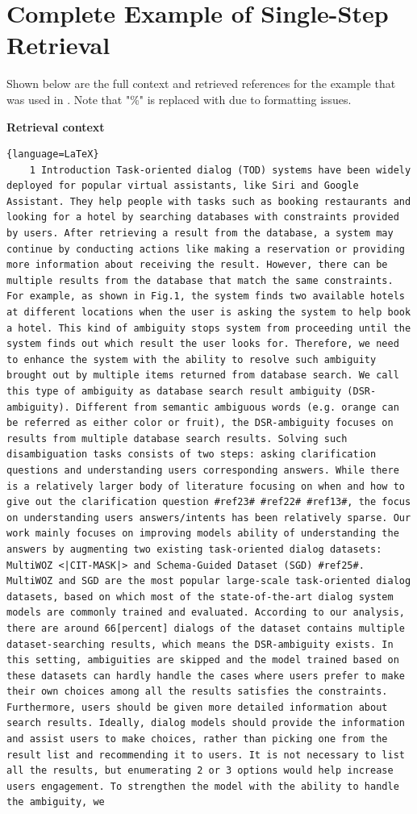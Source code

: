 \section{Complete Example of Single-Step Retrieval}\label{retrieval-example}
Shown below are the full context and retrieved references for the example that was used in . Note that "\%" is replaced with \mono{[percent]} due to formatting issues.

\textbf{Retrieval context}
\begin{lstlisting}{language=LaTeX}
    1 Introduction Task-oriented dialog (TOD) systems have been widely deployed for popular virtual assistants, like Siri and Google Assistant. They help people with tasks such as booking restaurants and looking for a hotel by searching databases with constraints provided by users. After retrieving a result from the database, a system may continue by conducting actions like making a reservation or providing more information about receiving the result. However, there can be multiple results from the database that match the same constraints. For example, as shown in Fig.1, the system finds two available hotels at different locations when the user is asking the system to help book a hotel. This kind of ambiguity stops system from proceeding until the system finds out which result the user looks for. Therefore, we need to enhance the system with the ability to resolve such ambiguity brought out by multiple items returned from database search. We call this type of ambiguity as database search result ambiguity (DSR-ambiguity). Different from semantic ambiguous words (e.g. orange can be referred as either color or fruit), the DSR-ambiguity focuses on results from multiple database search results. Solving such disambiguation tasks consists of two steps: asking clarification questions and understanding users corresponding answers. While there is a relatively larger body of literature focusing on when and how to give out the clarification question #ref23# #ref22# #ref13#, the focus on understanding users answers/intents has been relatively sparse. Our work mainly focuses on improving models ability of understanding the answers by augmenting two existing task-oriented dialog datasets: MultiWOZ <|CIT-MASK|> and Schema-Guided Dataset (SGD) #ref25#. MultiWOZ and SGD are the most popular large-scale task-oriented dialog datasets, based on which most of the state-of-the-art dialog system models are commonly trained and evaluated. According to our analysis, there are around 66[percent] dialogs of the dataset contains multiple dataset-searching results, which means the DSR-ambiguity exists. In this setting, ambiguities are skipped and the model trained based on these datasets can hardly handle the cases where users prefer to make their own choices among all the results satisfies the constraints. Furthermore, users should be given more detailed information about search results. Ideally, dialog models should provide the information and assist users to make choices, rather than picking one from the result list and recommending it to users. It is not necessary to list all the results, but enumerating 2 or 3 options would help increase users engagement. To strengthen the model with the ability to handle the ambiguity, we 
\end{lstlisting}
